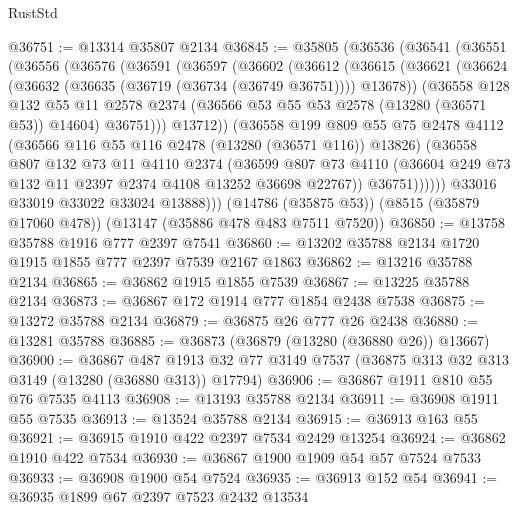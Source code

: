 \begin{lexlean}{RustStd}
\begin{coremodule}
@36751 := @13314 @35807 @2134
@36845 := @35805
    (@36536
      (@36541
        (@36551
          (@36556
            (@36576
              (@36591
                (@36597
                  (@36602
                    (@36612
                      (@36615
                        (@36621
                          (@36624 (@36632 (@36635 (@36719 (@36734 (@36749 @36751)))) @13678))
                          (@36558
                            @128
                            @132
                            @55
                            @11
                            @2578
                            @2374
                            (@36566 @53 @55 @53 @2578 (@13280 (@36571 @53)) @14604)
                            @36751)))
                      @13712))
                  (@36558
                    @199
                    @809
                    @55
                    @75
                    @2478
                    @4112
                    (@36566 @116 @55 @116 @2478 (@13280 (@36571 @116)) @13826)
                    (@36558
                      @807
                      @132
                      @73
                      @11
                      @4110
                      @2374
                      (@36599
                        @807
                        @73
                        @4110
                        (@36604 @249 @73 @132 @11 @2397 @2374 @4108 @13252 @36698 @22767))
                      @36751))))))
          @33016
          @33019
          @33022
          @33024
          @13888)))
    (@14786 (@35875 @53))
    (@8515 (@35879 @17060 @478))
    (@13147 (@35886 @478 @483 @7511 @7520))
@36850 := @13758 @35788 @1916 @777 @2397 @7541
@36860 := @13202 @35788 @2134 @1720 @1915 @1855 @777 @2397 @7539 @2167 @1863
@36862 := @13216 @35788 @2134
@36865 := @36862 @1915 @1855 @7539
@36867 := @13225 @35788 @2134
@36873 := @36867 @172 @1914 @777 @1854 @2438 @7538
@36875 := @13272 @35788 @2134
@36879 := @36875 @26 @777 @26 @2438
@36880 := @13281 @35788
@36885 := @36873 (@36879 (@13280 (@36880 @26)) @13667)
@36900 := @36867
    @487
    @1913
    @32
    @77
    @3149
    @7537
    (@36875 @313 @32 @313 @3149 (@13280 (@36880 @313)) @17794)
@36906 := @36867 @1911 @810 @55 @76 @7535 @4113
@36908 := @13193 @35788 @2134
@36911 := @36908 @1911 @55 @7535
@36913 := @13524 @35788 @2134
@36915 := @36913 @163 @55
@36921 := @36915 @1910 @422 @2397 @7534 @2429 @13254
@36924 := @36862 @1910 @422 @7534
@36930 := @36867 @1900 @1909 @54 @57 @7524 @7533
@36933 := @36908 @1900 @54 @7524
@36935 := @36913 @152 @54
@36941 := @36935 @1899 @67 @2397 @7523 @2432 @13534

\end{coremodule}
\end{lexlean}
